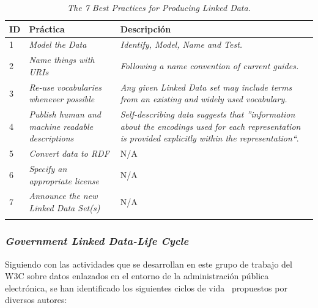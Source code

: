 \begin{longtable}[c]{|l|p{7cm}|p{8cm}|} 

\hline

  \textbf{ID} & \textbf{Práctica} & \textbf{Descripción} \\\hline

\endhead
  1 &  \textit{Model the Data} & \textit{Identify, Model, Name and Test.}\\ \hline
  2 &  \textit{Name things with \gls{URI}s} & \textit{Following a name convention of current guides.} \\ \hline
  3 &  \textit{Re-use vocabularies whenever possible} &   \textit{Any given Linked Data set may include terms from an existing and widely used vocabulary.} \\ \hline
  4 &  \textit{Publish human and machine readable descriptions} & \textit{Self-describing data suggests that ''information about the encodings used for each representation is provided explicitly within the representation``}.  \\ \hline
  5 &  \textit{Convert data to \gls{RDF}} & N/A \\ \hline
  6 &  \textit{Specify an appropriate license} & N/A \\ \hline
  7 &  \textit{Announce the new Linked Data Set(s) } &  N/A  \\ \hline    
 
\hline
\caption{\textit{The 7 Best Practices for Producing Linked Data.}}\label{table:linkeddata-practices}\\    
\end{longtable}


\subsubsection{\textit{Government Linked Data-Life Cycle}}\label{gld}
Siguiendo con las actividades que se desarrollan en este grupo de trabajo del W3C sobre datos enlazados
en el entorno de la administración pública electrónica, se han identificado los siguientes ciclos de vida~\cite{gld-lifecycle} propuestos
por diversos autores:

